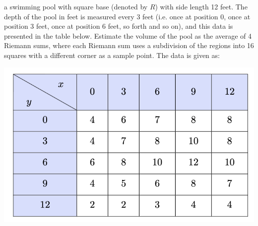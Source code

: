 \documentclass[12pt]{exam}
\begin{document}
\begin{questions}
a swimming pool with square base (denoted by $R$) with side length 12 feet. The depth of the pool in feet is measured every 3 feet (i.e. once at position 0, once at position 3 feet, once at position 6 feet, so
forth and so on), and this data is presented in the table below. Estimate the volume of the pool as the average of 4 Riemann sums, where each Riemann sum uses a subdivision of the regions into 16 squares
with a different corner as a sample point. The data is given as:
\begin{center}
    \includegraphics*[scale=0.7]{images/06-data.png}
\end{center}


\end{questions}
\end{document}
